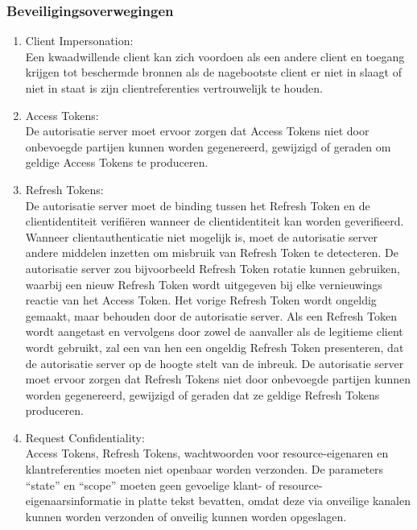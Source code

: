   \subsubsection{Beveiligingsoverwegingen}
  \label{subsubsec:beveiligingsoverwegingen}
  \begin{enumerate}[label=\textbf{-}]
      \item Client Impersonation: \\
      Een kwaadwillende client kan zich voordoen als een andere client en toegang krijgen tot beschermde bronnen als de nagebootste client er niet in slaagt of niet in staat is zijn clientreferenties vertrouwelijk te houden.
  
      \item Access Tokens: \\
      De autorisatie server moet ervoor zorgen dat Access Tokens niet door onbevoegde partijen kunnen worden gegenereerd, gewijzigd of geraden om geldige Access Tokens te produceren.
  
      \item Refresh Tokens: \\
      De autorisatie server moet de binding tussen het Refresh Token en de clientidentiteit verifiëren wanneer de clientidentiteit kan worden geverifieerd. Wanneer clientauthenticatie niet mogelijk is, moet de autorisatie server andere middelen inzetten om misbruik van Refresh Token te detecteren. De autorisatie server zou bijvoorbeeld Refresh Token rotatie kunnen gebruiken, waarbij een nieuw Refresh Token wordt uitgegeven bij elke vernieuwings reactie van het Access Token. Het vorige Refresh Token wordt ongeldig gemaakt, maar behouden door de autorisatie server. Als een Refresh Token wordt aangetast en vervolgens door zowel de aanvaller als de legitieme client wordt gebruikt, zal een van hen een ongeldig Refresh Token presenteren, dat de autorisatie server op de hoogte stelt van de inbreuk. De autorisatie server moet ervoor zorgen dat Refresh Tokens niet door onbevoegde partijen kunnen worden gegenereerd, gewijzigd of geraden dat ze geldige Refresh Tokens produceren.
  
      \item Request Confidentiality: \\
      Access Tokens, Refresh Tokens, wachtwoorden voor resource-eigenaren en klantreferenties moeten niet openbaar worden verzonden. De parameters ``state'' en ``scope'' moeten geen gevoelige klant- of resource-eigenaarsinformatie in platte tekst bevatten, omdat deze via onveilige kanalen kunnen worden verzonden of onveilig kunnen worden opgeslagen.
  \end{enumerate}


